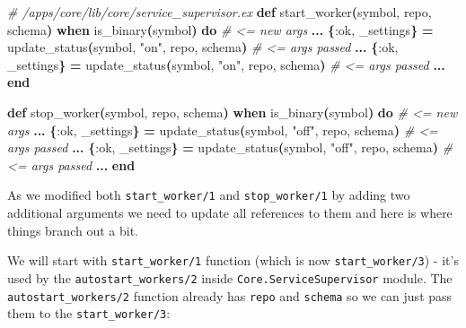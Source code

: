 \documentclass[
  oneside]{book}
\newenvironment{Shaded}{\begin{snugshade}}{\end{snugshade}}
\newcommand{\CommentTok}[1]{\textcolor[rgb]{0.56,0.35,0.01}{\textit{#1}}}
\newcommand{\FunctionTok}[1]{\textcolor[rgb]{0.13,0.29,0.53}{\textbf{#1}}}
\newcommand{\KeywordTok}[1]{\textcolor[rgb]{0.13,0.29,0.53}{\textbf{#1}}}
\newcommand{\NormalTok}[1]{#1}
\newcommand{\OperatorTok}[1]{\textcolor[rgb]{0.81,0.36,0.00}{\textbf{#1}}}
\newcommand{\StringTok}[1]{\textcolor[rgb]{0.31,0.60,0.02}{#1}}
\newcommand{\VariableTok}[1]{\textcolor[rgb]{0.00,0.00,0.00}{#1}}
\begin{document}
\begin{Shaded}
\begin{Highlighting}[]
  \CommentTok{\# /apps/core/lib/core/service\_supervisor.ex}
  \KeywordTok{def}\NormalTok{ start\_worker}\FunctionTok{(}\NormalTok{symbol, repo, schema}\FunctionTok{)} \KeywordTok{when}\NormalTok{ is\_binary}\FunctionTok{(}\NormalTok{symbol}\FunctionTok{)} \KeywordTok{do} \CommentTok{\# \textless{}= new args}
    \OperatorTok{...}
        \FunctionTok{\{}\VariableTok{:ok}\NormalTok{, \_settings}\FunctionTok{\}} \OperatorTok{=}\NormalTok{ update\_status}\FunctionTok{(}\NormalTok{symbol, }\StringTok{"on"}\NormalTok{, repo, schema}\FunctionTok{)} \CommentTok{\# \textless{}= args passed}
    \OperatorTok{...}
        \FunctionTok{\{}\VariableTok{:ok}\NormalTok{, \_settings}\FunctionTok{\}} \OperatorTok{=}\NormalTok{ update\_status}\FunctionTok{(}\NormalTok{symbol, }\StringTok{"on"}\NormalTok{, repo, schema}\FunctionTok{)} \CommentTok{\# \textless{}= args passed}
    \OperatorTok{...}
  \KeywordTok{end}

  \KeywordTok{def}\NormalTok{ stop\_worker}\FunctionTok{(}\NormalTok{symbol, repo, schema}\FunctionTok{)} \KeywordTok{when}\NormalTok{ is\_binary}\FunctionTok{(}\NormalTok{symbol}\FunctionTok{)} \KeywordTok{do} \CommentTok{\# \textless{}= new args}
    \OperatorTok{...}
        \FunctionTok{\{}\VariableTok{:ok}\NormalTok{, \_settings}\FunctionTok{\}} \OperatorTok{=}\NormalTok{ update\_status}\FunctionTok{(}\NormalTok{symbol, }\StringTok{"off"}\NormalTok{, repo, schema}\FunctionTok{)} \CommentTok{\# \textless{}= args passed}
    \OperatorTok{...}
        \FunctionTok{\{}\VariableTok{:ok}\NormalTok{, \_settings}\FunctionTok{\}} \OperatorTok{=}\NormalTok{ update\_status}\FunctionTok{(}\NormalTok{symbol, }\StringTok{"off"}\NormalTok{, repo, schema}\FunctionTok{)} \CommentTok{\# \textless{}= args passed}
    \OperatorTok{...}
  \KeywordTok{end}
\end{Highlighting}
\end{Shaded}

As we modified both \texttt{start\_worker/1} and \texttt{stop\_worker/1} by adding two additional arguments we need to update all references to them and here is where things branch out a bit.

\newpage

We will start with \texttt{start\_worker/1} function (which is now \texttt{start\_worker/3}) - it's used by the \texttt{autostart\_workers/2} inside \texttt{Core.ServiceSupervisor} module. The \texttt{autostart\_workers/2} function already has \texttt{repo} and \texttt{schema} so we can just pass them to the \texttt{start\_worker/3}:
\end{document}
